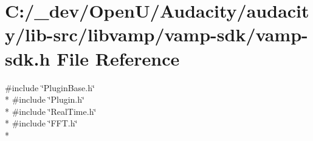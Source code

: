 \hypertarget{vamp-sdk_8h}{}\section{C\+:/\+\_\+dev/\+Open\+U/\+Audacity/audacity/lib-\/src/libvamp/vamp-\/sdk/vamp-\/sdk.h File Reference}
\label{vamp-sdk_8h}
{\ttfamily \#include \char`\"{}Plugin\+Base.\+h\char`\"{}}\\*
{\ttfamily \#include \char`\"{}Plugin.\+h\char`\"{}}\\*
{\ttfamily \#include \char`\"{}Real\+Time.\+h\char`\"{}}\\*
{\ttfamily \#include \char`\"{}F\+F\+T.\+h\char`\"{}}\\*

